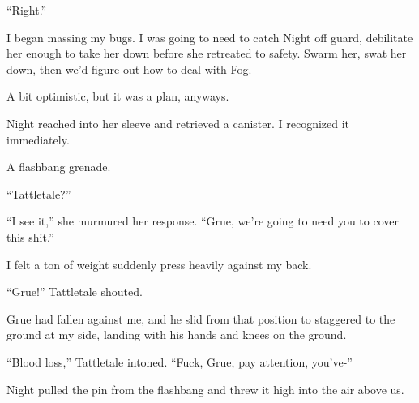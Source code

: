 ``Right.''



I began massing my bugs.  I was going to need to catch Night off guard, debilitate her enough to take her down before she retreated to safety.  Swarm her, swat her down, then we'd figure out how to deal with Fog.



A bit optimistic, but it was a plan, anyways.



Night reached into her sleeve and retrieved a canister.  I recognized it immediately.



A flashbang grenade.



``Tattletale?''



``I see it,'' she murmured her response.  ``Grue, we're going to need you to cover this shit.''



I felt a ton of weight suddenly press heavily against my back.



``Grue!'' Tattletale shouted.



Grue had fallen against me, and he slid from that position to staggered to the ground at my side, landing with his hands and knees on the ground.



``Blood loss,'' Tattletale intoned.  ``Fuck, Grue, pay attention, you've-''



Night pulled the pin from the flashbang and threw it high into the air above us.





